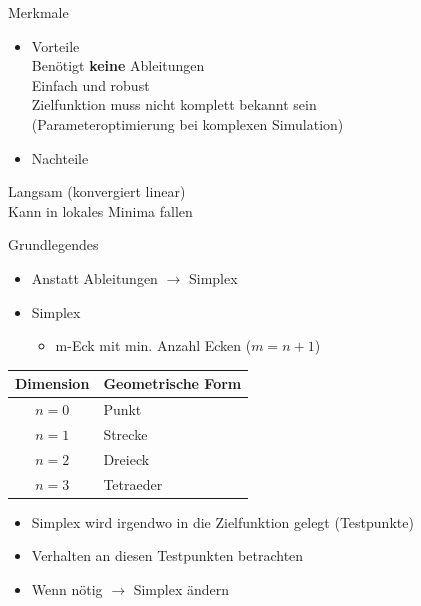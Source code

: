 \documentclass[\outputformat]{beamer}
\begin{document}
\begin{frame}{Merkmale}
	\begin{itemize}
		\item Vorteile\\
			\qquad Benötigt \textbf{keine} Ableitungen\\
			\qquad Einfach und robust\\
			\qquad Zielfunktion muss nicht komplett bekannt sein \\
			\qquad (Parameteroptimierung bei komplexen Simulation)
			
	\end{itemize}
	\begin{itemize}
		\item Nachteile\\
	\end{itemize}
	\qquad Langsam (konvergiert linear)\\
	\qquad Kann in lokales Minima fallen\\
	    
\end{frame}

\begin{frame}{Grundlegendes}
	\begin{itemize}
		\item Anstatt Ableitungen $\rightarrow$ Simplex
		\item Simplex
			\begin{itemize}
				\item m-Eck mit min. Anzahl Ecken ($m=n+1$)\\
			\end{itemize}
	\end{itemize}
	\begin{tabular}{c|l}
	Dimension & Geometrische Form\\
	\hline
	$n=0$ & Punkt\\
	$n=1$ & Strecke\\
	$n=2$ & Dreieck\\
	$n=3$ & Tetraeder
	\end{tabular} 
	\begin{itemize}
		\item Simplex wird irgendwo in die Zielfunktion gelegt (Testpunkte)
		\item Verhalten an diesen Testpunkten betrachten
		\item Wenn nötig $\rightarrow$ Simplex ändern
	\end{itemize}
\end{frame}
\end{document}
